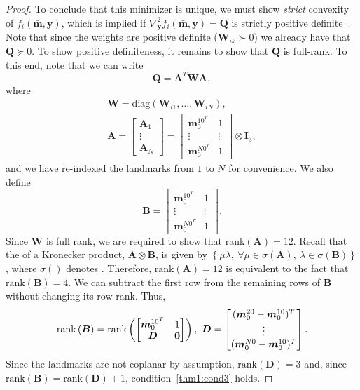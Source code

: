 \documentclass[lettersize,journal]{IEEEtran}
\newcommand{\rank}[1]{\mbox{rank}\left(#1\right)}
\newcommand{\diag}[1]{\mbox{diag}\left(#1\right)}
\newcommand{\rev}[1]{\color{red}{#1}\color{black}}
\begin{document}
\begin{proof}
To conclude that this minimizer is unique, we must show \emph{strict} convexity of $f_i(\bar{\bm{m}},\bm{y})$, which is implied if $\nabla_{\bm{y}}^2 f_i(\bar{\bm{m}},\bm{y}) = \bm{Q} $ is strictly positive definite~\cite{boydConvexOptimization2004}. Note that since the weights are positive definite ($\bm{W}_{ik}\succ 0 $) we already have that $\bm{Q} \succeq 0$. To show positive definiteness, it remains to show that $\bm{Q}$ is full-rank. To this end, note that we can write
\begin{equation}
	\bm{Q} = \bm{A}^T \bm{W} \bm{A},
\end{equation}
where
\begin{gather}
	\bm{W} = \diag{\bm{W}_{i1},\ldots,\bm{W}_{iN}},\\
	\bm{A} = \begin{bmatrix}
		 \bm{A}_1 \\ \vdots \\ \bm{A}_N
	\end{bmatrix} = \begin{bmatrix}
		 \bm{m}_0^{10^T} & 1 \\
		 \vdots& \vdots\\
		 \bm{m}_0^{N0^T} & 1
	\end{bmatrix}\otimes \bm{I}_3,
\end{gather}
and we have re-indexed the landmarks from $1$ to $N$ for convenience. We also define
\begin{equation*}
	\bm{B} = \begin{bmatrix}
		\bm{m}_0^{10^T} & 1 \\
		\vdots&\vdots\\
		\bm{m}_0^{N0^T} & 1
	\end{bmatrix}.
\end{equation*}
Since $\bm{W}$ is full rank, we are required to show that $\rank{\bm{A}} = 12$. 
Recall that the \rev{singular values } of a Kronecker product, $\bm{A}\otimes\bm{B}$, is given by $\left\{ \mu\lambda,~ \forall \mu \in \sigma(\bm{A}),~ \lambda \in \sigma(\bm{B})\right\}$, where $\sigma()$ denotes \rev{the set of singular values}.
Therefore, $\rank{\bm{A}} = 12$ is equivalent to the fact that $\rank{\bm{B}}=4$. We can subtract the first row from the remaining rows of $\bm{B}$ without changing its row rank. Thus,
\begin{equation*}
	\rank{\bm{B}} = \rank{\begin{bmatrix}
			\bm{m}_0^{10^T} & 1 \\
			\bm{D} & \bm{0}
		\end{bmatrix}}, ~ \bm{D} = \begin{bmatrix}
		(\bm{m}_0^{20}-\bm{m}_0^{10})^T  \\
		\vdots\\
		(\bm{m}_0^{N0}-\bm{m}_0^{10})^T 
	\end{bmatrix}.\\	
\end{equation*}
Since the landmarks are not coplanar by assumption, $\rank{\bm{D}}=3$ and, since $\rank{\bm{B}} = \rank{\bm{D}} + 1$, condition~\ref{thm1:cond3} holds.
 

\end{proof}
\end{document}
